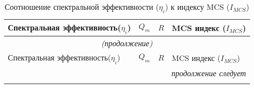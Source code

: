 \begin{longtable}{|l|l|l|l|}
\caption{Соотношение спектральной эффективности ($\eta_{i}$) к индексу MCS ($I_{MCS}$)}\label{MCS_spectr}
 \hline
 \hline
Спектральная эффективность($\eta_{i}$) & $Q_{m}$ & $R$        & MCS индекс ($I_{MCS}$) \\ \hline 



    \endfirsthead   \hline
 \multicolumn{4}{c|}{\small\slshape (продолжение)}        \\ \hline
Спектральная эффективность($\eta_{i}$) & $Q_{m}$ & $R$        & MCS индекс ($I_{MCS}$)   \\ \hline
        
                                              \endhead        \hline
 \multicolumn{4}{r|}{\small\slshape продолжение следует}  \\ \hline
                                              \endfoot        \hline
                                              \endlastfoot






\end{longtable}
